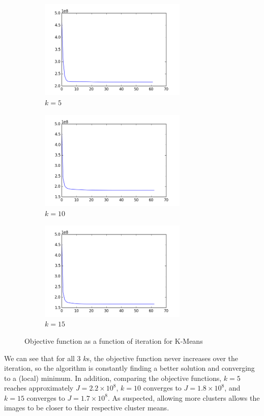 \documentclass[11pt]{amsart}
\begin{document}
\begin{figure}[h]
	\centering
	\begin{subfigure}{0.5\textwidth}
		\includegraphics[width=7cm]{images/k5objectives.png}
		\caption{$k=5$}
	\end{subfigure}
	\begin{subfigure}{0.3\textwidth}
		\includegraphics[width=7cm]{images/k10objectives.png}
		\caption{$k=10$}
	\end{subfigure}
	\begin{subfigure}{0.3\textwidth}
		\includegraphics[width=7cm]{images/k15objectives.png}
		\caption{$k=15$}
	\end{subfigure}
	\caption{Objective function as a function of iteration for K-Means}
\end{figure}

We can see that for all 3 $k$s, the objective function never increases over the iteration, so the algorithm is constantly finding a better solution and converging to a (local) minimum. In addition, comparing the objective functions, $k=5$ reaches approximately $J=2.2\times 10^{8}$, $k=10$ converges to $J=1.8\times 10^{8}$, and $k=15$ converges to $J=1.7\times 10^{8}$. As suspected, allowing more clusters allows the images to be closer to their respective cluster means.\\
\end{document}
